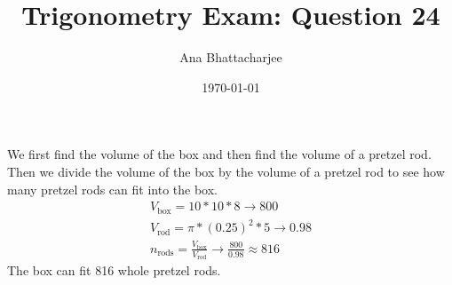 \documentclass{article}
\begin{document}
\title{Trigonometry Exam: Question 24}
\author{Ana Bhattacharjee}
\date{\today}
\maketitle

\begin{center}
  We first find the volume of the box and then find the volume of a pretzel rod. Then we divide the volume of the box by the volume of a pretzel rod to see how many pretzel rods can fit into the box.
  \begin{align}
    V_{\text{box}} = 10 * 10 * 8 \rightarrow 800 \\
    V_{\text{rod}} = \pi * (0.25)^2 * 5 \rightarrow 0.98 \\
    n_{\text{rods}} = \frac{V_{\text{box}}}{V_{\text{rod}}} \rightarrow \frac{800}{0.98} \approx 816
  \end{align}
  The box can fit 816 whole pretzel rods. 
\end{center}
\end{document}
